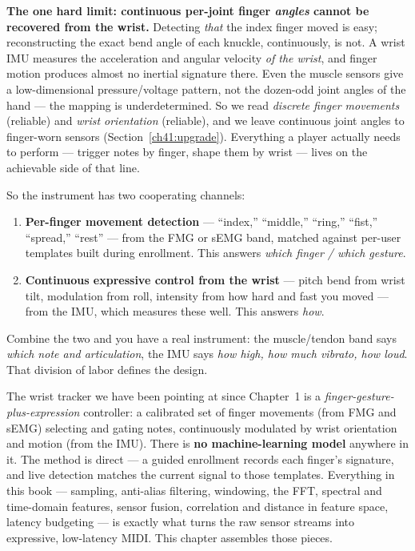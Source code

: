 \begin{trapbox}
\textbf{The one hard limit: continuous per-joint finger \emph{angles}
cannot be recovered from the wrist.} Detecting \emph{that} the index finger
moved is easy; reconstructing the exact bend angle of each knuckle, continuously,
is not. A wrist IMU measures the acceleration and angular velocity \emph{of the
wrist}, and finger motion produces almost no inertial signature there. Even the
muscle sensors give a low-dimensional pressure/voltage pattern, not the dozen-odd
joint angles of the hand --- the mapping is underdetermined. So we read
\emph{discrete finger movements} (reliable) and \emph{wrist orientation}
(reliable), and we leave continuous joint angles to finger-worn sensors
(Section~\ref{ch41:upgrade}). Everything a player actually needs to perform ---
trigger notes by finger, shape them by wrist --- lives on the achievable side
of that line.
\end{trapbox}

So the instrument has two cooperating channels:

\begin{enumerate}
  \item \textbf{Per-finger movement detection} --- ``index,'' ``middle,''
        ``ring,'' ``fist,'' ``spread,'' ``rest'' --- from the FMG or sEMG band,
        matched against per-user templates built during enrollment. This answers
        \emph{which finger / which gesture}.
  \item \textbf{Continuous expressive control from the wrist} --- pitch bend from
        wrist tilt, modulation from roll, intensity from how hard and fast you
        moved --- from the IMU, which measures these well. This answers
        \emph{how}.
\end{enumerate}

Combine the two and you have a real instrument: the muscle/tendon band says
\emph{which note and articulation}, the IMU says \emph{how high, how much
vibrato, how loud}. That division of labor defines the design.

\begin{goalbox}
The wrist tracker we have been pointing at since Chapter~1 is a
\emph{finger-gesture-plus-expression} controller: a calibrated set of finger
movements (from FMG and sEMG) selecting and gating notes, continuously
modulated by wrist orientation and motion (from the IMU). There is \textbf{no
machine-learning model} anywhere in it. The method is direct --- a guided
enrollment records each finger's signature, and live detection matches the
current signal to those templates. Everything in this book --- sampling,
anti-alias filtering, windowing, the FFT, spectral and time-domain features,
sensor fusion, correlation and distance in feature space, latency budgeting ---
is exactly what turns the raw sensor streams into expressive, low-latency MIDI.
This chapter assembles those pieces.
\end{goalbox}

